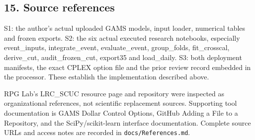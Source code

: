 \documentclass[
  11pt,
  a4paper,
]{article}
\begin{document}
\subsection{15. Source references}\label{source-references}

S1: the author's actual uploaded GAMS models, input loader, numerical
tables and frozen exports. S2: the six actual executed research
notebooks, especially event\_inputs, integrate\_event, evaluate\_event,
group\_folds, fit\_crosscal, derive\_cut, audit\_frozen\_cut, export35
and load\_daily. S3: both deployment manifests, the exact CPLEX option
file and the prior review record embedded in the processor. These
establish the implementation described above.

RPG Lab's LRC\_SCUC resource page and repository were inspected as
organizational references, not scientific replacement sources.
Supporting tool documentation is GAMS Dollar Control Options, GitHub
Adding a File to a Repository, and the SciPy/scikit-learn interface
documentation. Complete source URLs and access notes are recorded in
\texttt{docs/References.md}.
\end{document}
